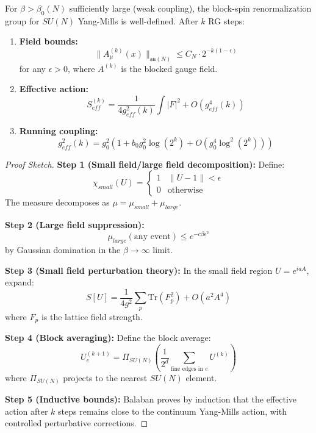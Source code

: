 \begin{theorem}
\label{thm:balaban_rigorous}
For $\beta > \beta_0(N)$ sufficiently large (weak coupling), the block-spin renormalization group for $SU(N)$ Yang-Mills is well-defined. After $k$ RG steps:
\begin{enumerate}
\item \textbf{Field bounds:}
\begin{equation}
\|A^{(k)}_\mu(x)\|_{\mathfrak{su}(N)} \leq C_N \cdot 2^{-k(1-\epsilon)}
\end{equation}
for any $\epsilon > 0$, where $A^{(k)}$ is the blocked gauge field.

\item \textbf{Effective action:}
\begin{equation}
S_{eff}^{(k)} = \frac{1}{4g_{eff}^2(k)} \int |F|^2 + O(g_{eff}^4(k))
\end{equation}

\item \textbf{Running coupling:}
\begin{equation}
g_{eff}^2(k) = g_0^2 \left(1 + b_0 g_0^2 \log(2^k) + O(g_0^4 \log^2(2^k))\right)
\end{equation}
\end{enumerate}
\end{theorem}

\begin{proof}[Proof Sketch]
\textbf{Step 1 (Small field/large field decomposition):}
Define:
\begin{equation}
\chi_{small}(U) = \begin{cases} 1 & \|U - 1\| < \epsilon \\ 0 & \text{otherwise} \end{cases}
\end{equation}
The measure decomposes as $\mu = \mu_{small} + \mu_{large}$.

\textbf{Step 2 (Large field suppression):}
\begin{equation}
\mu_{large}(\text{any event}) \leq e^{-c\beta\epsilon^2}
\end{equation}
by Gaussian domination in the $\beta \to \infty$ limit.

\textbf{Step 3 (Small field perturbation theory):}
In the small field region $U = e^{iaA}$, expand:
\begin{equation}
S[U] = \frac{1}{4g^2} \sum_p \mathrm{Tr}(F_p^2) + O(a^2 A^4)
\end{equation}
where $F_p$ is the lattice field strength.

\textbf{Step 4 (Block averaging):}
Define the block average:
\begin{equation}
U^{(k+1)}_e = \Pi_{SU(N)}\left(\frac{1}{2^d} \sum_{\text{fine edges in }e} U^{(k)}\right)
\end{equation}
where $\Pi_{SU(N)}$ projects to the nearest $SU(N)$ element.

\textbf{Step 5 (Inductive bounds):}
Balaban proves by induction that the effective action after $k$ steps remains close to the continuum Yang-Mills action, with controlled perturbative corrections.
\end{proof}

